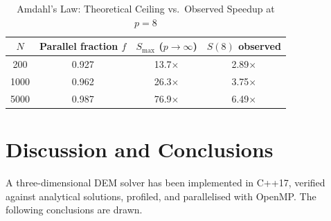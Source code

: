 \documentclass[journal]{IEEEtran}
\begin{document}
\begin{table}[!t]
\renewcommand{\arraystretch}{1.3}
\caption{Amdahl's Law: Theoretical Ceiling vs.\ Observed Speedup at $p=8$}
\label{tab:amdahl}
\centering
\begin{tabular}{cccc}
\toprule
$N$ & Parallel fraction $f$ & $S_{\max}$ ($p\to\infty$) & $S(8)$ observed \\
\midrule
200  & 0.927 & 13.7$\times$ & 2.89$\times$ \\
1000 & 0.962 & 26.3$\times$ & 3.75$\times$ \\
5000 & 0.987 & 76.9$\times$ & 6.49$\times$ \\
\bottomrule
\end{tabular}
\end{table}

\section{Discussion and Conclusions}

A three-dimensional DEM solver has been implemented in C++17, verified
against analytical solutions, profiled, and parallelised with OpenMP.
The following conclusions are drawn.
\end{document}
